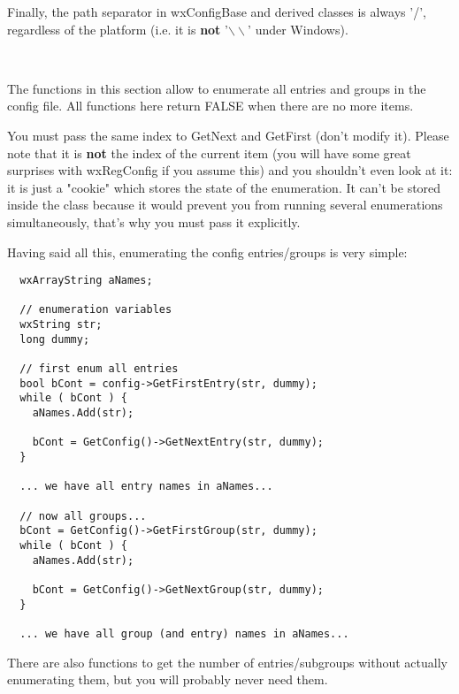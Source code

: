 Finally, the path separator in wxConfigBase and derived classes is always '/',
regardless of the platform (i.e. it is {\bf not} '$\backslash\backslash$' under Windows).

\\


The functions in this section allow to enumerate all entries and groups in the
config file. All functions here return FALSE when there are no more items.

You must pass the same index to GetNext and GetFirst (don't modify it).
Please note that it is {\bf not} the index of the current item (you will have
some great surprises with wxRegConfig if you assume this) and you shouldn't
even look at it: it is just a "cookie" which stores the state of the
enumeration. It can't be stored inside the class because it would prevent you
from running several enumerations simultaneously, that's why you must pass it
explicitly.

Having said all this, enumerating the config entries/groups is very simple:

\begin{verbatim}
  wxArrayString aNames;

  // enumeration variables
  wxString str;
  long dummy;

  // first enum all entries
  bool bCont = config->GetFirstEntry(str, dummy);
  while ( bCont ) {
    aNames.Add(str);

    bCont = GetConfig()->GetNextEntry(str, dummy);
  }

  ... we have all entry names in aNames...

  // now all groups...
  bCont = GetConfig()->GetFirstGroup(str, dummy);
  while ( bCont ) {
    aNames.Add(str);

    bCont = GetConfig()->GetNextGroup(str, dummy);
  }

  ... we have all group (and entry) names in aNames...

\end{verbatim}

There are also functions to get the number of entries/subgroups without
actually enumerating them, but you will probably never need them.

\\
\\
\\
\\
\\

